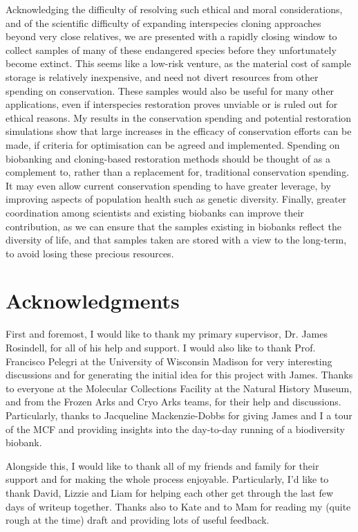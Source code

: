 \documentclass[12pt]{article}
\begin{document}
	Acknowledging the difficulty of resolving such ethical and moral considerations,
	and of the scientific difficulty of expanding interspecies cloning approaches
	beyond very close relatives, we are presented with a rapidly
	closing window to collect samples of many of these endangered species before
	they unfortunately become extinct. This seems like a low-risk venture, as the
	material cost of sample storage is relatively inexpensive, and
	need not divert resources from other spending on conservation.
	These samples would
	also be useful for many other applications, even if interspecies restoration
	proves unviable or is ruled out for ethical reasons. My results
	in the conservation spending and potential restoration simulations show that
	large increases in the efficacy of conservation efforts can be made, if
	criteria for optimisation can be agreed and implemented.
	Spending on biobanking and cloning-based restoration methods should
	be thought of as a complement to, rather than a replacement for,
	traditional conservation spending. It may even allow current conservation
	spending to have greater leverage, by improving aspects of population health
	such as genetic diversity.
	Finally, greater coordination among scientists and existing biobanks
	can improve their contribution, as we can ensure that the samples existing in
	biobanks reflect the diversity of life, and that samples taken are stored with
	a view to the long-term, to avoid losing these precious resources.
	
	\pagebreak
	
	\section{Acknowledgments}
	First and foremost, I would like to thank my primary supervisor, Dr. James
	Rosindell, for all of his help and support. I would also like to thank
	Prof. Francisco Pelegri at the University of Wisconsin Madison for very
	interesting discussions and for generating the initial idea for this
	project with James. Thanks to everyone at the Molecular Collections
	Facility at the Natural History Museum, and from the Frozen Arks and
	Cryo Arks teams, for their help and discussions. Particularly, thanks to
	Jacqueline Mackenzie-Dobbs for giving James and I a tour of the MCF
	and providing
	insights into the day-to-day running of a biodiversity biobank.
	
	Alongside this, I would like to thank all of my friends and family
	for their support and for making the whole process enjoyable. Particularly,
	I'd like to thank David, Lizzie and Liam for helping each other get
	through the last few days of writeup together. Thanks also to Kate
	and to Mam for reading my (quite rough at the time) draft and providing
	lots of useful feedback.
	
\end{document}
